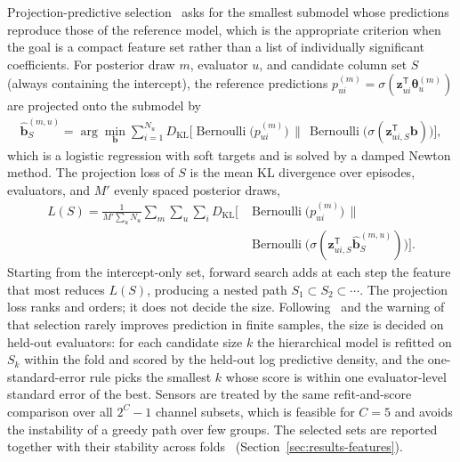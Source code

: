 \documentclass[lettersize,journal]{IEEEtran}
\newcommand{\Bern}{\operatorname{Bernoulli}}
\newcommand{\KL}{D_{\mathrm{KL}}}
\newcommand{\sigmoid}{\sigma}
\newcommand{\T}{\mathsf{T}}
\begin{document}
Projection-predictive selection~\cite{piironen2020projective} asks for the smallest submodel whose predictions reproduce those of the reference model, which is the appropriate criterion when the goal is a compact feature set rather than a list of individually significant coefficients. For posterior draw $m$, evaluator $u$, and candidate column set $S$ (always containing the intercept), the reference predictions $p^{(m)}_{ui}=\sigmoid(\bm z_{ui}^{\T}\bm\theta_u^{(m)})$ are projected onto the submodel by
\begin{equation}
\begin{split}
 \widehat{\bm b}^{(m,u)}_S=\arg\min_{\bm b}\sum_{i=1}^{N_u}
 \KL\!\Big[\Bern\big(p^{(m)}_{ui}\big)\,\Big\|\,\Bern\big(\sigmoid(\bm z_{ui,S}^{\T}\bm b)\big)\Big],
\end{split}
 \label{eq:projection}
\end{equation}
which is a logistic regression with soft targets and is solved by a damped Newton method. The projection loss of $S$ is the mean KL divergence over episodes, evaluators, and $M'$ evenly spaced posterior draws,
\begin{equation}
\begin{split}
 L(S)=\frac{1}{M'\sum_u N_u}\sum_{m}\sum_{u}\sum_{i}
 \KL\!\Big[&\Bern\big(p^{(m)}_{ui}\big)\,\Big\|\\
 &\Bern\big(\sigmoid(\bm z_{ui,S}^{\T}\widehat{\bm b}^{(m,u)}_S)\big)\Big].
\end{split}
 \label{eq:projloss}
\end{equation}
Starting from the intercept-only set, forward search adds at each step the feature that most reduces $L(S)$, producing a nested path $S_1\subset S_2\subset\cdots$. The projection loss ranks and orders; it does not decide the size. Following~\cite{piironen2020projective} and the warning of~\cite{riha2026selection} that selection rarely improves prediction in finite samples, the size is decided on held-out evaluators: for each candidate size $k$ the hierarchical model is refitted on $S_k$ within the fold and scored by the held-out log predictive density, and the one-standard-error rule picks the smallest $k$ whose score is within one evaluator-level standard error of the best. Sensors are treated by the same refit-and-score comparison over all $2^{C}-1$ channel subsets, which is feasible for $C=5$ and avoids the instability of a greedy path over few groups. The selected sets are reported together with their stability across folds~\cite{nogueira2018stability} (Section~\ref{sec:results-features}).
\end{document}
